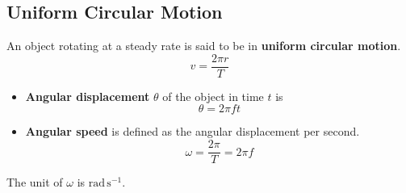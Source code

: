 \subsection{Uniform Circular Motion}

An object rotating at a steady rate is said to be in \textbf{uniform circular motion}.
$$v=\frac{2\pi r}{T}$$

\begin{itemize}
    \item \textbf{Angular displacement} $\theta$ of the object in time $t$ is
        $$\theta=2\pi ft$$
    \item \textbf{Angular speed} is defined as the angular displacement per second.
        $$\omega=\frac{2\pi}{T}=2\pi f$$
\end{itemize}

The unit of $\omega$ is $\text{rad}\,\text{s}^{-1}$.
